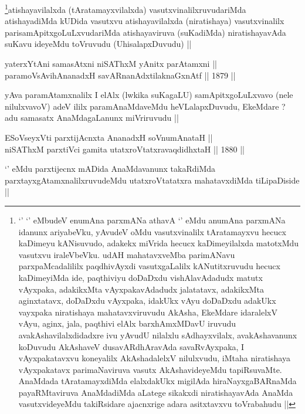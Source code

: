 \begin{artha}
\footnote[1]{`\stext' `\stext' eMbudeV enumAna parxmANa athavA
  `\stext' eMdu anumAna parxmANa idanunx ariyabeVku, yAvudeV oMdu
  vasutxvinalilx tAratamayxvu hecucx kaDimeyu kANisuvudo, adakekx
  miVrida hecucx kaDimeyilalxda matotxMdu vasutxvu iraleVbeVku. udAH
  mahatavxveMba parimANavu parxpaMcadalililx paqdhivAyxdi
  vasutxgaLalilx kANutitxruvudu hecucx kaDimeyiMda ide, paqthiviyu
  doDaDxdu vishAlavAdadudx matutx vAyxpaka, adakikxMta
  vAyxpakavAdadudx jalatatavx, adakikxMta aginxtatavx, doDaDxdu
  vAyxpaka, idakUkx vAyu doDaDxdu adakUkx vayxpaka niratishaya
  mahatavxviruvudu AkAsha, EkeMdare idaralelxV vAyu, aginx, jala,
  paqthivi elAlx barxhAmxMDavU iruvudu avakAshavilalxdidadxre ivu
  yAvudU nilalxlu sAdhayxvilalx, avakAshavanunx koDuvudu AkAshaveV
  dusavARdhAravAda savaRvAyxpaka, I vAyxpakatavxvu koneyalilx
  AkAshadalelxV nilulxvudu, iMtaha niratishaya vAyxpakatavx
  parimaNaviruva vasutx AkAshavideyeMdu tapiRsuvaMte. AnaMdada
  tAratamayxdiMda elalxdakUkx migilAda hiraNayxgaBARnaMda
  payaRMtaviruva AnaMdadiMda aLatege sikakxdi niratishayavAda AnaMda
  vasutxvideyeMdu takiRsidare ajacnxrige  adara asitxtavxvu
  toVrabahudu ||}atishayavilalxda (tAratamayxvilalxda)
vasutxvinalilxruvudariMda atishayadiMda kUDida vasutxvu
atishayavilalxda (niratishaya) vasutxvinalilx
parisamApitxgoLuLxvudariMda atishayaviruva (suKadiMda) niratishayavAda
suKavu ideyeMdu toVruvudu (UhisalapxDuvudu) ||
\end{artha}

\begin{shl}
yaterxYtAni samasAtxni niSAThxM yAnitx parAtamxni || \\
paramoV\s sAvihA\s \s nanadxH savARnanAdxtilaknaGxnAtf ||  1879 ||  
\end{shl}

\begin{artha}
yAva paramAtamxnalilx I elAlx (lwkika suKagaLU) samApitxgoLuLxvavo
(nele nilulxvavoV) adeV ililx paramAnaMdaveMdu heVLalapxDuvudu,
EkeMdare ? adu samasatx AnaMdagaLanunx miVriruvudu ||
\end{artha}

\begin{shl}
ESoV\s seyxVti parxtijAcnxta AnanadxH soV\s numAnataH || \\
niSAThxM parxtiVci gamita utatxroVtatxravaqdidhxtaH ||  1880 ||  
\end{shl}

\begin{artha}
`\stext' eMdu parxtijecnx mADida AnaMdavanunx takaRdiMda
  parxtayxgAtamxnalilxruvudeMdu utatxroVtatatxra mahatavxdiMda
  tiLipaDiside ||
\end{artha}

